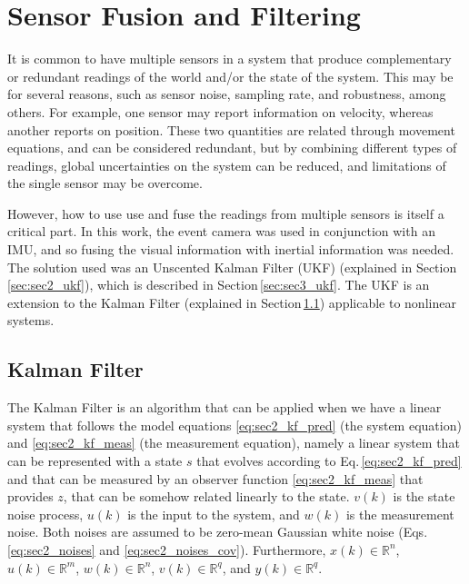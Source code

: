 \section{Sensor Fusion and Filtering}
\label{sec:sec_filtering}

It is common to have multiple sensors in a system that produce complementary or redundant readings of the world and/or the state of the system. This may be for several reasons, such as sensor noise, sampling rate, and robustness, among others. For example, one sensor may report information on velocity, whereas another reports on position. These two quantities are related through movement equations, and can be considered redundant, but by combining different types of readings, global uncertainties on the system can be reduced, and limitations of the single sensor may be overcome.

However, how to use use and fuse the readings from multiple sensors is itself a critical part. In this work, the event camera was used in conjunction with an IMU, and so fusing the visual information with inertial information was needed. The solution used was an Unscented Kalman Filter (UKF) (explained in Section\,\ref{sec:sec2_ukf}), which is described in Section\,\ref{sec:sec3_ukf}. The UKF is an extension to the Kalman Filter (explained in Section\,\ref{sec:sec2_kf}) applicable to nonlinear systems.

\subsection{Kalman Filter}
\label{sec:sec2_kf}

The Kalman Filter \cite{kalman1960new} is an algorithm that can be applied when we have a linear system that follows the model equations \eqref{eq:sec2_kf_pred} (the system equation) and \eqref{eq:sec2_kf_meas} (the measurement equation), namely a linear system that can be represented with a state $s$ that evolves according to Eq.\,\eqref{eq:sec2_kf_pred} and that can be measured by an observer function \eqref{eq:sec2_kf_meas} that provides $z$, that can be somehow related linearly to the state. $v(k)$ is the state noise process, $u(k)$ is the input to the system, and $w(k)$ is the measurement noise. Both noises are assumed to be zero-mean Gaussian white noise (Eqs.\,\eqref{eq:sec2_noises} and \eqref{eq:sec2_noises_cov}). Furthermore, $x(k) \in \mathbb{R} ^n$, $u(k) \in \mathbb{R} ^m$, $w(k) \in \mathbb{R} ^n$, $v(k) \in \mathbb{R} ^q$, and $y(k) \in \mathbb{R} ^q$.

